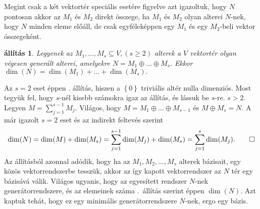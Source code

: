 \documentclass[9pt, a4paper, showtrims]{memoir}
\makeatletter
\renewenvironment{proof}[1][\proofname]
    {\par\pushQED{\qed}%
    \normalfont \topsep6\p@\@plus6\p@\relax
    \trivlist
    \item[\hskip\labelsep
        \itshape
    #1\@addpunct{:}]\ignorespaces}
    {\popQED\endtrivlist\@endpefalse}
\theoremstyle{plain}
\newtheorem{proposition}{állítás}[chapter]
\theoremstyle{remark}
\theoremstyle{definition}
\makeatother
\begin{document}
Megint csak a két vektortér speciális esetére figyelve
azt igazoltuk, hogy $N$ pontosan akkor az $M_1$ és $M_2$ direkt összege,
ha $M_1$ és $M_2$ olyan alterei $N$-nek, hogy $N$ minden eleme előáll,
de csak egyféleképpen egy $M_1$ és egy $M_2$-beli vektor összegeként.
\begin{proposition}\label{pr:drosszeg}
	Legyenek az $M_1,\ldots,M_s\subseteq V, (s\geq 2)$ alterek a $V$ vektortér olyan végesen generált alterei,
	amelyekre
	\(
	N=M_1\oplus\dots\oplus M_s.
	\)
	Ekkor
	\(
	\dim(N)=
	\dim(M_1)+\dots+\dim(M_s).
	\)
\end{proposition}
\begin{proof}
	Az $s=2$ eset éppen . állítás,
	hiszen a $\left\{ 0 \right\}$ triviális altér nulla dimenziós.
	Most tegyük fel, hogy $s$-nél kisebb számokra igaz az állítás,
	és lássuk be $s$-re. $s>2.$
	Legyen $M=\sum_{j=1}^{s-1}M_j.$
	Világos, hogy $M=M_1\oplus\dots\oplus M_{s-1}$ és $M\oplus M_s=N$.
	A már igazolt $s=2$ eset és az indirekt feltevés szerint
	\[
		\dim(N)
		=
		\dim(M)+\dim(M_s)
		=
		\sum_{j=1}^{s-1}\dim(M_j)+\dim(M_s)
		=
		\sum_{j=1}^{s}\dim(M_j).\qedhere
	\]
\end{proof}
Az állításból azonnal adódik,
hogy ha az $M_1, M_2, \dots,M_s$ alterek bázisait, egy közös vektorrendszerbe tesszük,
akkor az így kapott vektorrendszer az $N$ tér egy bázisává válik.
Világos ugyanis, hogy az egyesített rendszer $N$-nek generátorrendszere,
és az elemeinek száma .~állítás szerint éppen $\dim(N)$.
Azt kaptuk tehát, hogy ez egy minimális generátorrendszere $N$-nek,
ergo egy bázis.
\end{document}
